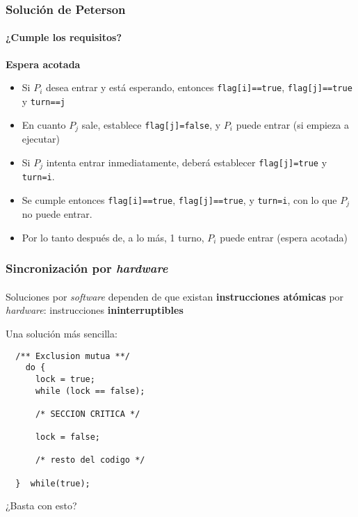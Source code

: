 \documentclass[letter]{beamer}
\begin{document}
\begin{frame}
  \frametitle{Solución de Peterson}
  \framesubtitle{¿Cumple los requisitos?}

  {\bf Espera acotada}
  
  \begin{itemize}
    \item Si $P_i$ desea entrar y está esperando, entonces {\tt flag[i]==true}, {\tt flag[j]==true} y {\tt turn==j}
    \item En cuanto $P_j$ sale, establece {\tt flag[j]=false}, y $P_i$ puede entrar (si empieza a ejecutar)
    \item Si $P_j$ intenta entrar inmediatamente, deberá establecer {\tt flag[j]=true} y {\tt turn=i}.
    \item Se cumple entonces {\tt flag[i]==true}, {\tt flag[j]==true}, y {\tt turn=i}, con lo que $P_j$ no puede entrar.    
    \item Por lo tanto después de, a lo más, 1 turno, $P_i$ puede entrar (espera acotada)
  \end{itemize}

\end{frame}

\begin{frame}[fragile]
  \frametitle{Sincronización por {\em hardware} }
  \framesubtitle{}

  Soluciones por {\em software} dependen de que existan {\bf instrucciones atómicas} por {\em hardware}:
  instrucciones {\bf ininterruptibles}

  Una solución más sencilla:
\begin{verbatim}
  /** Exclusion mutua **/
    do {
      lock = true;
      while (lock == false);
      
      /* SECCION CRITICA */
      
      lock = false;
  
      /* resto del codigo */
      
  }  while(true);
\end{verbatim}
  
  ¿Basta con esto?
\end{frame}
\end{document}
